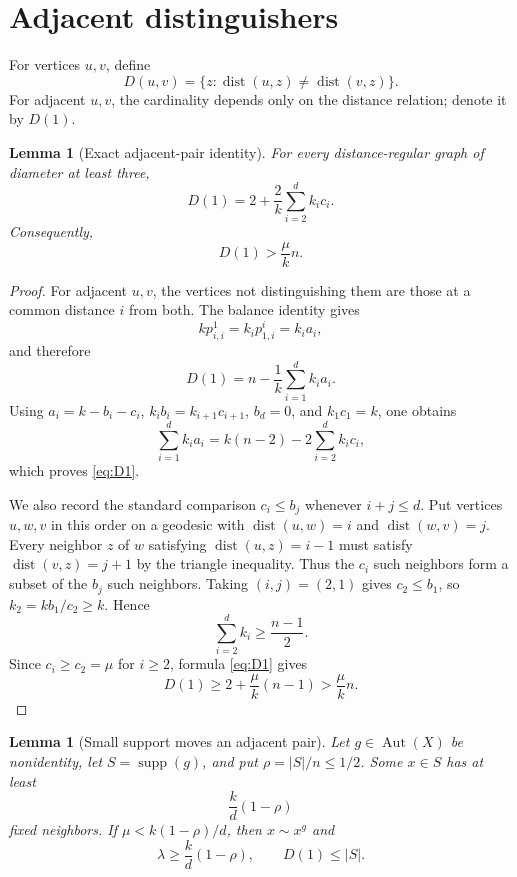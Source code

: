 \documentclass[11pt]{amsart}
\newtheorem{lemma}[theorem]{Lemma}
\theoremstyle{definition}
\newcommand{\supp}{\operatorname{supp}}
\newcommand{\dist}{\operatorname{dist}}
\newcommand{\Aut}{\operatorname{Aut}}
\begin{document}
\section{Adjacent distinguishers}
For vertices $u,v$, define
\[
 D(u,v)=\{z:\dist(u,z)\ne\dist(v,z)\}.
\]
For adjacent $u,v$, the cardinality depends only on the distance relation; denote it by $D(1)$.

\begin{lemma}[Exact adjacent-pair identity]\label{lem:D1}
For every distance-regular graph of diameter at least three,
\begin{equation}\label{eq:D1}
 D(1)=2+\frac2k\sum_{i=2}^{d}k_i c_i.
\end{equation}
Consequently,
\begin{equation}\label{eq:D1mu}
 D(1)>\frac{\mu}{k}n.
\end{equation}
\end{lemma}

\begin{proof}
For adjacent $u,v$, the vertices not distinguishing them are those at a common distance $i$ from both.  The balance identity gives
\[
 kp^1_{i,i}=k_i p^i_{1,i}=k_i a_i,
\]
and therefore
\[
 D(1)=n-\frac1k\sum_{i=1}^{d}k_i a_i.
\]
Using $a_i=k-b_i-c_i$, $k_i b_i=k_{i+1}c_{i+1}$, $b_d=0$, and $k_1c_1=k$, one obtains
\[
 \sum_{i=1}^{d}k_i a_i=k(n-2)-2\sum_{i=2}^{d}k_i c_i,
\]
which proves \eqref{eq:D1}.

We also record the standard comparison $c_i\le b_j$ whenever $i+j\le d$.  Put vertices $u,w,v$ in this order on a geodesic with $\dist(u,w)=i$ and $\dist(w,v)=j$.  Every neighbor $z$ of $w$ satisfying $\dist(u,z)=i-1$ must satisfy $\dist(v,z)=j+1$ by the triangle inequality.  Thus the $c_i$ such neighbors form a subset of the $b_j$ such neighbors.  Taking $(i,j)=(2,1)$ gives $c_2\le b_1$, so $k_2=kb_1/c_2\ge k$.  Hence
\[
 \sum_{i=2}^{d}k_i\ge\frac{n-1}{2}.
\]
Since $c_i\ge c_2=\mu$ for $i\ge2$, formula \eqref{eq:D1} gives
\[
 D(1)\ge2+\frac{\mu}{k}(n-1)>\frac{\mu}{k}n.
\]
\end{proof}

\begin{lemma}[Small support moves an adjacent pair]\label{lem:adjacent}
Let $g\in\Aut(X)$ be nonidentity, let $S=\supp(g)$, and put $\rho=|S|/n\le1/2$.  Some $x\in S$ has at least
\begin{equation}\label{eq:fixed}
 \frac{k}{d}(1-\rho)
\end{equation}
fixed neighbors.  If $\mu<k(1-\rho)/d$, then $x\sim x^g$ and
\begin{equation}\label{eq:supportconsequences}
 \lambda\ge\frac{k}{d}(1-\rho),
 \qquad D(1)\le |S|.
\end{equation}
\end{lemma}
\end{document}
